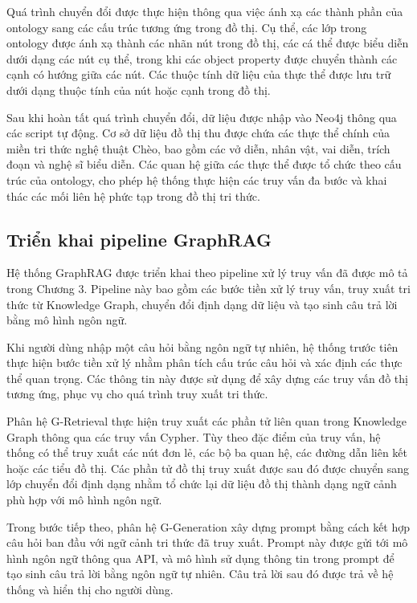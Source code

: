 Quá trình chuyển đổi được thực hiện thông qua việc ánh xạ các thành phần của ontology sang các cấu trúc tương ứng trong đồ thị. Cụ thể, các lớp trong ontology được ánh xạ thành các nhãn nút trong đồ thị, các cá thể được biểu diễn dưới dạng các nút cụ thể, trong khi các object property được chuyển thành các cạnh có hướng giữa các nút. Các thuộc tính dữ liệu của thực thể được lưu trữ dưới dạng thuộc tính của nút hoặc cạnh trong đồ thị.

Sau khi hoàn tất quá trình chuyển đổi, dữ liệu được nhập vào Neo4j thông qua các script tự động. Cơ sở dữ liệu đồ thị thu được chứa các thực thể chính của miền tri thức nghệ thuật Chèo, bao gồm các vở diễn, nhân vật, vai diễn, trích đoạn và nghệ sĩ biểu diễn. Các quan hệ giữa các thực thể được tổ chức theo cấu trúc của ontology, cho phép hệ thống thực hiện các truy vấn đa bước và khai thác các mối liên hệ phức tạp trong đồ thị tri thức.

\subsection{Triển khai pipeline GraphRAG}

Hệ thống GraphRAG được triển khai theo pipeline xử lý truy vấn đã được mô tả trong Chương 3. Pipeline này bao gồm các bước tiền xử lý truy vấn, truy xuất tri thức từ Knowledge Graph, chuyển đổi định dạng dữ liệu và tạo sinh câu trả lời bằng mô hình ngôn ngữ.

Khi người dùng nhập một câu hỏi bằng ngôn ngữ tự nhiên, hệ thống trước tiên thực hiện bước tiền xử lý nhằm phân tích cấu trúc câu hỏi và xác định các thực thể quan trọng. Các thông tin này được sử dụng để xây dựng các truy vấn đồ thị tương ứng, phục vụ cho quá trình truy xuất tri thức.

Phân hệ G-Retrieval thực hiện truy xuất các phần tử liên quan trong Knowledge Graph thông qua các truy vấn Cypher. Tùy theo đặc điểm của truy vấn, hệ thống có thể truy xuất các nút đơn lẻ, các bộ ba quan hệ, các đường dẫn liên kết hoặc các tiểu đồ thị. Các phần tử đồ thị truy xuất được sau đó được chuyển sang lớp chuyển đổi định dạng nhằm tổ chức lại dữ liệu đồ thị thành dạng ngữ cảnh phù hợp với mô hình ngôn ngữ.

Trong bước tiếp theo, phân hệ G-Generation xây dựng prompt bằng cách kết hợp câu hỏi ban đầu với ngữ cảnh tri thức đã truy xuất. Prompt này được gửi tới mô hình ngôn ngữ thông qua API, và mô hình sử dụng thông tin trong prompt để tạo sinh câu trả lời bằng ngôn ngữ tự nhiên. Câu trả lời sau đó được trả về hệ thống và hiển thị cho người dùng.

